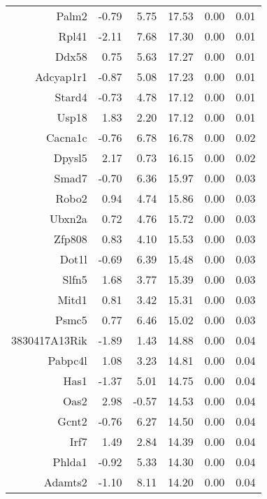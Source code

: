 \begin{table}[ht]
\begin{tabular}{rrrrrr}
  Palm2 & -0.79 & 5.75 & 17.53 & 0.00 & 0.01 \\ 
  Rpl41 & -2.11 & 7.68 & 17.30 & 0.00 & 0.01 \\ 
  Ddx58 & 0.75 & 5.63 & 17.27 & 0.00 & 0.01 \\ 
  Adcyap1r1 & -0.87 & 5.08 & 17.23 & 0.00 & 0.01 \\ 
  Stard4 & -0.73 & 4.78 & 17.12 & 0.00 & 0.01 \\ 
  Usp18 & 1.83 & 2.20 & 17.12 & 0.00 & 0.01 \\ 
  Cacna1c & -0.76 & 6.78 & 16.78 & 0.00 & 0.02 \\ 
  Dpysl5 & 2.17 & 0.73 & 16.15 & 0.00 & 0.02 \\ 
  Smad7 & -0.70 & 6.36 & 15.97 & 0.00 & 0.03 \\ 
  Robo2 & 0.94 & 4.74 & 15.86 & 0.00 & 0.03 \\ 
  Ubxn2a & 0.72 & 4.76 & 15.72 & 0.00 & 0.03 \\ 
  Zfp808 & 0.83 & 4.10 & 15.53 & 0.00 & 0.03 \\ 
  Dot1l & -0.69 & 6.39 & 15.48 & 0.00 & 0.03 \\ 
  Slfn5 & 1.68 & 3.77 & 15.39 & 0.00 & 0.03 \\ 
  Mitd1 & 0.81 & 3.42 & 15.31 & 0.00 & 0.03 \\ 
  Psmc5 & 0.77 & 6.46 & 15.02 & 0.00 & 0.03 \\ 
  3830417A13Rik & -1.89 & 1.43 & 14.88 & 0.00 & 0.04 \\ 
  Pabpc4l & 1.08 & 3.23 & 14.81 & 0.00 & 0.04 \\ 
  Has1 & -1.37 & 5.01 & 14.75 & 0.00 & 0.04 \\ 
  Oas2 & 2.98 & -0.57 & 14.53 & 0.00 & 0.04 \\ 
  Gcnt2 & -0.76 & 6.27 & 14.50 & 0.00 & 0.04 \\ 
  Irf7 & 1.49 & 2.84 & 14.39 & 0.00 & 0.04 \\ 
  Phlda1 & -0.92 & 5.33 & 14.30 & 0.00 & 0.04 \\ 
  Adamts2 & -1.10 & 8.11 & 14.20 & 0.00 & 0.04 \\ 
   \hline
\end{tabular}
\end{table}


